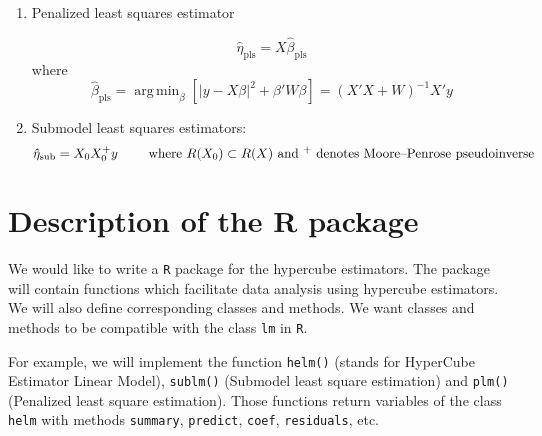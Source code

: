 \documentclass[draft]{article}
\DeclareMathOperator*{\argmin}{arg\,min}
\begin{document}
%
%
%
%
%

\begin{enumerate}
	\item Penalized least squares estimator

	$$
		\hat{\eta}_\text{pls} = X \hat{\beta}_\text{pls}
	$$
	where 
	$$
		\hat{\beta}_\text{pls} = \argmin_{\beta} [ | y - X\beta |^2 + \beta' W \beta ] = (X'X + W)^{-1} X' y 
	$$
	\item Submodel least squares estimators:
	$$
		\hat{\eta}_\text{sub} = X_0 X_0^+ y \qquad \text{ where $R(X_0) \subset R(X)$ and \textsuperscript{+} denotes Moore–Penrose pseudoinverse}
	$$
\end{enumerate}


\section{Description of the R package}

\indent  We would like to write a {\tt R} package\cite{leisch2008creating} for the hypercube estimators. The package will contain functions which facilitate data analysis using hypercube estimators. We will also define corresponding classes and methods. We want classes and methods to be compatible with the class {\tt lm} in {\tt R}.

For example, we will implement the function \texttt{helm()} (stands for HyperCube Estimator Linear Model), \texttt{sublm()} (Submodel least square estimation) and \texttt{plm()} (Penalized least square estimation). Those functions return variables of the class {\tt helm} with methods {\tt summary}, {\tt predict}, {\tt coef}, {\tt residuals}, etc.
\end{document}
